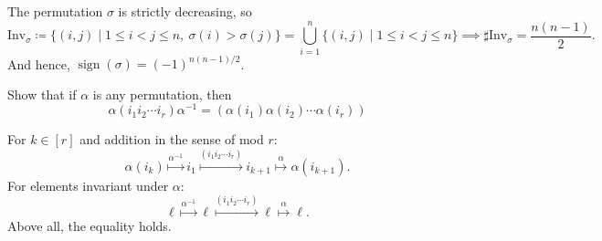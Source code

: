 \begin{solution}
    The permutation $\sigma$ is strictly decreasing, so
    \[
        \mathrm{Inv}_{\sigma}\coloneqq \{(i,j)\mid 1\leq i<j\leq n,\ \sigma(i)>\sigma(j) \}=\bigcup_{i=1}^{n}\{(i,j)\mid 1\leq i<j\leq n\}\implies\sharp\mathrm{Inv}_{\sigma}=\frac{n(n-1)}{2}.
    \]
    And hence, $\operatorname{sign}(\sigma)=(-1)^{n(n-1)/2}$.
\end{solution}

\setcounter{pb}{17}
\begin{problem}
    Show that if $ \alpha $ is any permutation, then
    \[
    \alpha (i_1 i_2 \cdots i_r) \alpha^{-1} = (\alpha (i_1) \alpha (i_2) \cdots \alpha (i_r))
    \]
\end{problem}

\begin{solution}
    For $k\in[r]$ and addition in the sense of mod $r$:
        \[
            \alpha(i_{k})
            \overset{\alpha^{-1}}{\longmapsto} i_{1}
            \overset{(i_1 i_2 \cdots i_r)}{\longmapsto} i_{k+1}
            \overset{\alpha}{\longmapsto} \alpha(i_{k+1}).
        \]
    For elements invariant under $\alpha$:
        \[
            \ell
            \overset{\alpha^{-1}}{\longmapsto} \ell
            \overset{(i_1 i_2 \cdots i_r)}{\longmapsto} \ell
            \overset{\alpha}{\longmapsto} \ell.
        \]
    Above all, the equality holds.
\end{solution}

